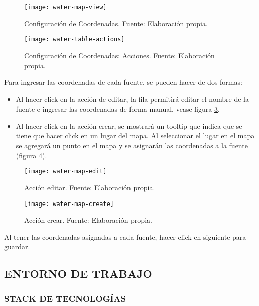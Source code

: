 \begin{figure}[H]
	\centering
	\texttt{[image: water-map-view]}
	\caption{\label{fig:water-map-view} Configuración de Coordenadas. Fuente: Elaboración propia.}
\end{figure}

\begin{figure}[H]
	\centering
	\texttt{[image: water-table-actions]}
	\caption{\label{fig:water-table-actions} Configuración de Coordenadas: Acciones. Fuente: Elaboración propia.}
\end{figure}

Para ingresar las coordenadas de cada fuente, se pueden hacer de dos formas:
\begin{itemize}
    \item Al hacer click en la acción de editar, la fila permitirá editar el nombre de la fuente e ingresar las coordenadas de forma manual, vease figura \ref{fig:water-map-edit}.    
    \item Al hacer click en la acción crear, se mostrará un tooltip que indica que se tiene que hacer click en un lugar del mapa. Al seleccionar el lugar en el mapa se agregará un punto en el mapa y se asignarán las coordenadas a la fuente (figura \ref{fig:water-map-create}).
\end{itemize}

 \begin{figure}[H]
	\centering
	\texttt{[image: water-map-edit]}
	\caption{\label{fig:water-map-edit} Acción editar. Fuente: Elaboración propia.}
\end{figure}

\begin{figure}[H]
   \centering
   \texttt{[image: water-map-create]}
   \caption{\label{fig:water-map-create} Acción crear. Fuente: Elaboración propia.}
\end{figure}

Al tener las coordenadas asignadas a cada fuente, hacer click en siguiente para guardar.
\fi


\subsection{ENTORNO DE TRABAJO}

\subsubsection{STACK DE TECNOLOGÍAS}


